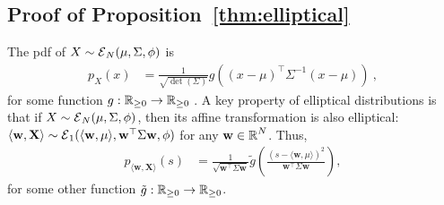 \subsection{Proof of Proposition~\ref{thm:elliptical}}
The pdf of $X \sim \operatorname{\mathcal{E}}_N(\mu, \Sigma, \phi)$ is
\begin{align*}
    p_X(x) &= \frac{1}{\sqrt{\det(\Sigma)}} g( (x-\mu)^\top \Sigma^{-1} (x-\mu) )~,
\end{align*}
for some function $g : \operatorname{\mathbb{R}}_{\geq 0} \to \operatorname{\mathbb{R}}_{\geq 0}$ \cite{frahm2004generalized}.
A key property of elliptical distributions is that if $X \sim \operatorname{\mathcal{E}}_N(\mu, \Sigma, \phi)$, then its affine transformation is also elliptical: $\langle \mathbf{w}, \mathbf{X} \rangle \sim \operatorname{\mathcal{E}}_1(\langle \mathbf{w}, \mu \rangle, \mathbf{w}^\top \Sigma \mathbf{w}, \phi)$ for any $\mathbf{w} \in \operatorname{\mathbb{R}}^N$.
Thus,
\begin{align*}
  p_{\langle \mathbf{w}, \mathbf{X} \rangle}(s) &= \frac{1}{\sqrt{\mathbf{w}^\top \Sigma \mathbf{w}}} \tilde{g}\left( \frac{(s-\langle \mathbf{w}, \mu \rangle)^2}{\mathbf{w}^\top \Sigma \mathbf{w}} \right),
\end{align*}
for some other function $\tilde{g} : \operatorname{\mathbb{R}}_{\geq 0} \to \operatorname{\mathbb{R}}_{\geq 0}$.

